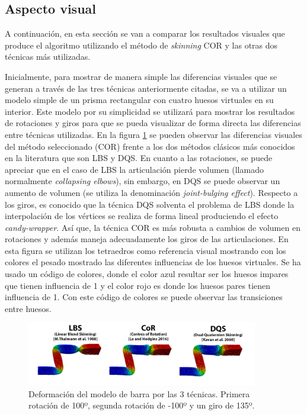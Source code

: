 \subsection{Aspecto visual} 
A continuación, en esta sección se van a comparar los resultados visuales que produce el algoritmo utilizando el método de \emph{skinning} \ac{COR} y las otras dos técnicas más utilizadas. 


Inicialmente, para mostrar de manera simple las diferencias visuales que se generan a través de las tres técnicas anteriormente citadas, se va a utilizar un modelo simple de un prisma rectangular con cuatro huesos virtuales en su interior. Este modelo por su simplicidad se utilizará para mostrar los resultados de rotaciones y giros para que se pueda visualizar de forma directa las diferencias entre técnicas utilizadas. En la figura \ref{fig:bar_bending} se pueden observar las diferencias visuales del método seleccionado (\ac{COR}) frente a los dos métodos clásicos más conocidos en la literatura que son \ac{LBS} y \ac{DQS}. En cuanto a las rotaciones, se puede apreciar que en el caso de \ac{LBS} la articulación pierde volumen (llamado normalmente \emph{collapsing elbows}), sin embargo, en \ac{DQS} se puede observar un aumento de volumen (se utiliza la denominación \emph{joint-bulging effect}). Respecto a los giros, es conocido que la técnica \ac{DQS} solventa el problema de \ac{LBS} donde la interpolación de los vértices se realiza de forma lineal produciendo el efecto \emph{candy-wrapper}. Así que, la técnica \ac{COR} es más robusta a cambios de volumen en rotaciones y además maneja adecuadamente los giros de las articulaciones. En esta figura se utilizan los tetraedros como referencia visual mostrando con los colores el pesado mostrado las diferentes influencias de los huesos virtuales. Se ha usado un código de colores, donde el color azul resultar ser los huesos impares que tienen influencia de 1 y el color rojo es donde los huesos pares tienen influencia de 1. Con este código de colores se puede observar las transiciones entre huesos.

\begin{figure}[h]%
  \centering
  \includegraphics[width=0.90\textwidth]{IMG/BarraCoR}
    \caption{Deformación del modelo de barra por las 3 técnicas. Primera rotación de 100º, segunda rotación de -100º y un giro de 135º.}
    \label{fig:bar_bending}
\end{figure}

